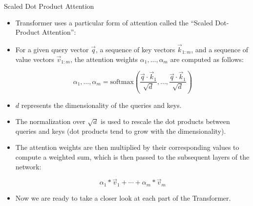 \documentclass[handout]{beamer}
\begin{document}
\begin{frame}{Scaled Dot Product Attention}
\begin{scriptsize}
\begin{itemize}

  \item  Transformer uses a particular form of attention called the “Scaled Dot-Product Attention”:

  \item For a given query vector $\vec{q}$, a sequence of key vectors $\vec{k}_{1:m}$, and a sequence of value vectors $\vec{v}_{1:m}$,  the attention weights $\alpha_1,\dots,\alpha_m$  are computed as follows:


  \begin{displaymath}
    \alpha_1,\dots,\alpha_m = \text{softmax}\left(\frac{\vec{q} \cdot \vec{k}_{1}}{\sqrt{d}}, \dots,\frac{\vec{q} \cdot \vec{k}_{1}}{\sqrt{d}}\right)
  \end{displaymath}


 \item $d$ represents the dimensionality of the queries and keys.

  \item The normalization over $\sqrt{d}$ is used to rescale the dot products between queries and keys (dot products tend to grow with the dimensionality).

  \item The attention weights are then multiplied by their corresponding values to compute a weighted sum, which is then passed to the subsequent layers of the network:

  \begin{displaymath}
   \alpha_1*\vec{v}_1+\cdots+\alpha_m*\vec{v}_m
  \end{displaymath}

 \item Now we are ready to take a closer look at each part of the Transformer.


\end{itemize}

\end{scriptsize}

\end{frame}
\end{document}
